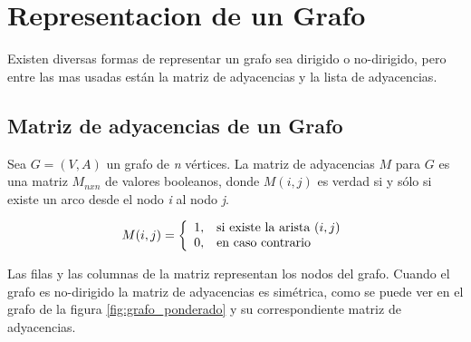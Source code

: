     \section{Representacion de un Grafo} %
    \label{sec:representacion_de_un_grafo}
      Existen diversas formas de representar un grafo sea dirigido o no-dirigido, pero entre las mas usadas están la matriz de adyacencias y la lista de adyacencias.

      \subsection{Matriz de adyacencias de un Grafo} %
      \label{sub:matriz_de_adyacencias_de_un_grafo}
        Sea $G = (V,A)$ un grafo de \emph{n} vértices. La matriz de adyacencias $M$  para $G$ es una matriz $M_{nxn}$ de valores booleanos, donde $M(i,j)$ es verdad si y sólo si existe un arco desde el nodo \emph{i} al nodo \emph{j}.

        \begin{displaymath}
          M(i,j) = \left\{
          \begin{array}{ l l }
            1, & \textrm{si existe la arista } (i,j) \\
            0, & \textrm{en caso contrario}
          \end{array} \right.
        \end{displaymath}


        Las filas y las columnas de la matriz representan los nodos del grafo.
        Cuando el grafo es no-dirigido la matriz de adyacencias es simétrica, como se puede ver en el grafo de la figura \ref{fig:grafo_ponderado} y su correspondiente matriz de adyacencias.


